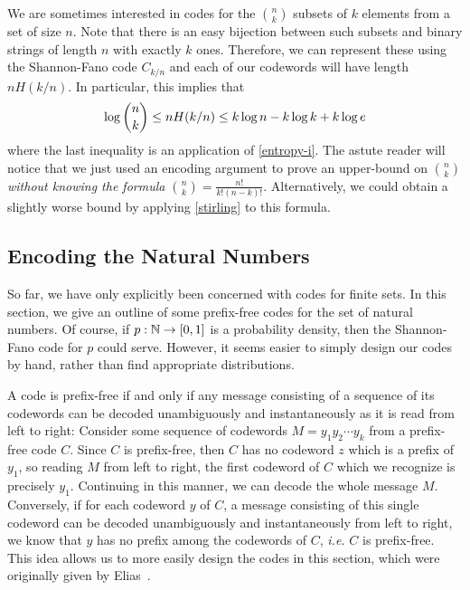 \documentclass{patmorin}
\begin{document}
We are sometimes interested in codes for the $\binom{n}{k}$ subsets of
$k$ elements from a set of size $n$. Note that there is an easy
bijection between such subsets and binary strings of length $n$ with
exactly $k$ ones. Therefore, we can represent these using the
Shannon-Fano code $C_{k/n}$ and each of our codewords will have length
$nH(k/n)$.  In particular, this implies that
\begin{equation}
  \log\binom{n}{k} \le nH(k/n) \le k\log n - k\log k + k\log e 
  \eqlabel{log-n-choose-k}
\end{equation}
where the last inequality is an application of \eqref{entropy-i}. The
astute reader will notice that we just used an encoding argument to
prove an upper-bound on $\binom{n}{k}$ \emph{without knowing the 
formula $\binom{n}{k}=\frac{n!}{k! (n - k)!}$}. Alternatively, we 
could obtain a slightly worse bound by applying 
\eqref{stirling} to this formula.

\subsection{Encoding the Natural Numbers}

So far, we have only explicitly been concerned with codes for finite
sets. In this section, we give an outline of some
prefix-free codes for the set of natural numbers. Of course, if $p :
\mathbb{N} \to [0, 1]$ is a probability density, then the Shannon-Fano code
for $p$ could serve. However, it seems easier to simply design our
codes by hand, rather than find appropriate distributions.

A code is prefix-free if and only if any message consisting of a
sequence of its codewords can be decoded unambiguously and
instantaneously as it is read from left to right: Consider some
sequence of codewords $M = y_1 y_2 \cdots y_k$ from a prefix-free code
$C$. Since $C$ is prefix-free, then $C$ has no codeword $z$ which is a
prefix of $y_1$, so reading $M$ from left to right, the first codeword
of $C$ which we recognize is precisely $y_1$. Continuing in this
manner, we can decode the whole message $M$. Conversely, if for each
codeword $y$ of $C$, a message consisting of this single codeword can
be decoded unambiguously and instantaneously from left to right, we
know that $y$ has no prefix among the codewords of $C$, \emph{i.e.}
$C$ is prefix-free. 
This idea allows us to more easily design
the codes in this section, which were originally given by
Elias~\cite{elias:coding}.
\end{document}

